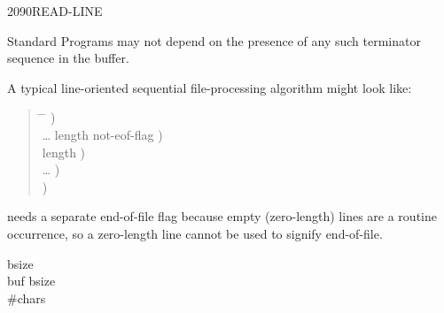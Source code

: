 \begin{worddef}{2090}{READ-LINE}
\begin{rationale}
		Standard Programs may not depend on the presence of any such
		terminator sequence in the buffer.

		A typical line-oriented sequential file-processing algorithm
		might look like:

		\begin{quote}\ttfamily{}
		  \begin{tabbing}
			\tab \= \hspace{12em} \= \kill
							\>\>  ) \\
			\> {\ldots}  
										\>	 \word{p} length not-eof-flag ) \\
			 			\>\>  length ) \\
			\> {\ldots}				\>	  ) \\
			 	\>\>  ) \\
		  \end{tabbing}
		\end{quote}

		 needs a separate end-of-file flag because
		empty (zero-length) lines are a routine occurrence, so a
		zero-length line cannot be used to signify end-of-file.
	\end{rationale}

	\begin{testing}  bsize \\
		 buf bsize  \\
		 \#chars

		 \\
		 \\
		 \\
		 \\
	\end{testing}
\end{worddef}


